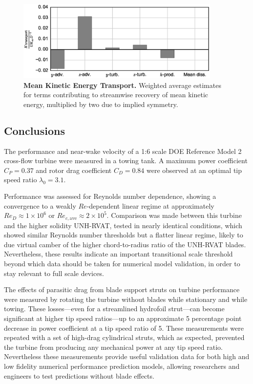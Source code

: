 \documentclass[10pt,letterpaper]{article}
\begin{document}
\begin{figure}
    \includegraphics[width=0.9\textwidth]{figures/K_trans_bar_graph.eps}

    \caption{{\bf Mean Kinetic Energy Transport.} Weighted average estimates for
    terms contributing to streamwise recovery of mean kinetic energy, multiplied
    by two due to implied symmetry.}

    \label{fig:Ktransport}
\end{figure}


\subsection*{Conclusions}

The performance and near-wake velocity of a 1:6 scale DOE Reference Model 2
cross-flow turbine were measured in a towing tank. A maximum power coefficient
$C_P = 0.37$ and rotor drag coefficient $C_D = 0.84$ were observed at an optimal
tip speed ratio $\lambda_0 = 3.1$.

Performance was assessed for Reynolds number dependence, showing a convergence
to a weakly $Re$-dependent linear regime at approximately $Re_D \approx 1 \times
10^6$ or $Re_{c,\mathrm{ave}} \approx 2 \times 10^5$. Comparison was made
between this turbine and the higher solidity UNH-RVAT, tested in nearly
identical conditions, which showed similar Reynolds number thresholds but a
flatter linear regime, likely to due virtual camber of the higher
chord-to-radius ratio of the UNH-RVAT blades. Nevertheless, these results
indicate an important transitional scale threshold beyond which data should be
taken for numerical model validation, in order to stay relevant to full scale
devices.

The effects of parasitic drag from blade support struts on turbine performance
were measured by rotating the turbine without blades while stationary and while
towing. These losses---even for a streamlined hydrofoil strut---can become
significant at higher tip speed ratios---up to an approximate 5 percentage point
decrease in power coefficient at a tip speed ratio of 5. These measurements were
repeated with a set of high-drag cylindrical struts, which as expected,
prevented the turbine from producing any mechanical power at any tip speed
ratio. Nevertheless these measurements provide useful validation data for both
high and low fidelity numerical performance prediction models, allowing
researchers and engineers to test predictions without blade effects.
\end{document}
